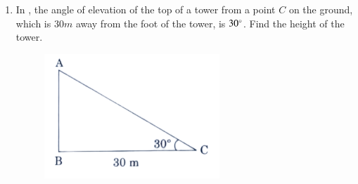 \begin{enumerate}[label=\thesubsection.\arabic*.,ref=\thesubsection.\theenumi]
\begin{figure}[H]
			\caption{}
			\label{fig:traingle}
		\end{figure}
		Based on the above, answer the following questions 
\begin{enumerate}
			\item The width of the canal is
				\begin{multicols}{4}
\begin{enumerate}
					\item ${10}\sqrt{3} m$
					\item ${20}\sqrt{3} m$
					\item $10 m$
					\item $20 m$
				\end{enumerate}
\end{multicols}
			\item Height of the tower is
				\begin{multicols}{4}
\begin{enumerate}
					\item ${10}\sqrt{3} m$
					\item $10 m$
					\item ${20}\sqrt{3} m$
					\item $20 m$
				\end{enumerate}
\end{multicols}
			\item Distance of the foot of the tower from the point $D$ is
				\begin{multicols}{4}
\begin{enumerate}
					\item $20 m$
					\item $30 m$
					\item $10 m$
					\item ${20}\sqrt{3} m$
				\end{enumerate}
\end{multicols}
\end{enumerate}
\hfill{}
\item In , the angle of elevation of the top of a tower from a point $C$ on the ground, which is $30m$ away from the foot of the tower, is $30\degree$. Find the height of the tower.      
\begin{figure}[H]
\centering
\includegraphics[width=0.75\columnwidth]{cbse/figs/Fig-4.png}

\end{figure}
\end{enumerate}
